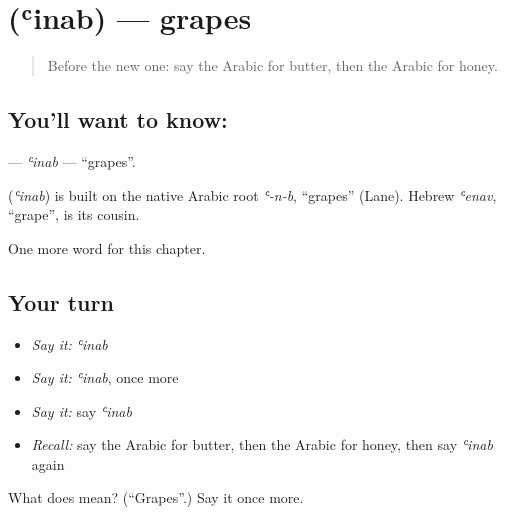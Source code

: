 \section[\texorpdfstring{\ar{عنب} (ʿinab)}{عنب (ʿinab)}]{ (ʿinab) — grapes}

\label{lesson:AR-C67-inab}



\begin{quote}
Before the new one: say the Arabic for butter, then the Arabic for honey.
\end{quote}

\subsection*{You'll want to know: }
\textbf{} — \emph{ʿinab} — \textquotedblleft{}grapes\textquotedblright{}.

\begin{cousinweb}
\textbf{} (\emph{ʿinab}) is built on the native Arabic root \emph{ʿ-n-b}, \textquotedblleft{}grapes\textquotedblright{} (Lane). Hebrew \emph{ʿenav}, \textquotedblleft{}grape\textquotedblright{}, is its cousin.
\end{cousinweb}

\begin{grammarlens}[title={What you've built}]
One more word for this chapter.
\end{grammarlens}

\subsection*{Your turn}
\begin{itemize}
\raggedright
  \item \emph{Say it:} \emph{ʿinab}
  \item \emph{Say it:} \emph{ʿinab}, once more
  \item \emph{Say it:} say \emph{ʿinab}
  \item \emph{Recall:} say the Arabic for butter, then the Arabic for honey, then say \emph{ʿinab} again
\end{itemize}

\begin{tcolorbox}[breakable,colback=teal!4,colframe=teal!35!black,title={Before you move on}]
What does  mean? (\textquotedblleft{}Grapes\textquotedblright{}.) Say it once more.
\end{tcolorbox}
